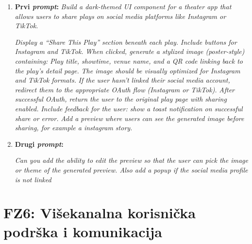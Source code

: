 \begin{enumerate}[itemsep=1ex]
    \item \textbf{Prvi \textit{prompt}:}
\textit{
    Build a dark-themed UI component for a theater app that allows users to share plays on social media platforms like Instagram or TikTok.}

    \textit{Display a “Share This Play” section beneath each play.
    }
    \textit{Include buttons for Instagram and TikTok.
    }
    \textit{When clicked, generate a stylized image (poster-style) containing:
    }
    \textit{Play title, showtime, venue name, and a QR code linking back to the play’s detail page.
    }
    \textit{The image should be visually optimized for Instagram and TikTok formats.
    }
    \textit{If the user hasn’t linked their social media account, redirect them to the appropriate OAuth flow (Instagram or TikTok).
    }
    \textit{After successful OAuth, return the user to the original play page with sharing enabled.
    }
    \textit{Include feedback for the user: show a toast notification on successful share or error.
    }
    \textit{Add a preview where users can see the generated image before sharing, for example a instagram story.
    }

    \vspace{0.5cm}
    \item \textbf{Drugi \textit{prompt}:}

    \textit{Can you add the ability to edit the preview so that the user can pick the image or theme of the generated preview. Also add a  popup if the social media profile is not linked}
\end{enumerate}
\pagebreak


\sloppy  
\section{FZ6: Višekanalna korisnička podrška i komunikacija}  

\sloppy  
